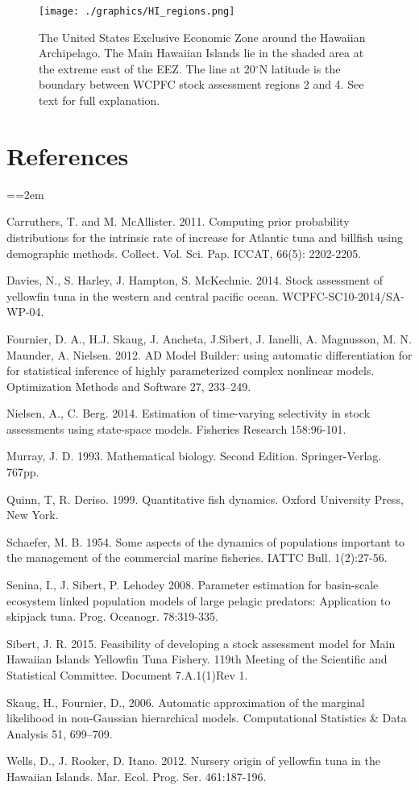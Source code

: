 \documentclass[12pt,letterpaper]{article}
\newcommand\doublespacing{\baselineskip=1.6\normalbaselineskip}
\renewcommand\deg[1]{$^\circ$#1}
\begin{document}
\begin{figure}
\begin{center}
\texttt{[image: ./graphics/HI\_regions.png]}
\caption{\label{fig:mhimap}
The United States Exclusive Economic Zone around the Hawaiian
Archipelago. The Main Hawaiian Islands lie in the shaded area at the
extreme east of the EEZ. The line at 20\deg{N} latitude is the
boundary between WCPFC stock assessment regions 2 and 4. See text for
full explanation.
}
\end{center}
\end{figure}

\section*{References}
{\parindent=0cm \small
\everypar={\hangindent=2em }\par
Carruthers, T. and M. McAllister. 2011.
Computing prior probability distributions for the
intrinsic rate of increase for Atlantic tuna and
billfish using demographic methods.
Collect. Vol. Sci. Pap. ICCAT, 66(5): 2202-2205.

Davies, N., S. Harley, J. Hampton, S. McKechnie. 2014. Stock
assessment of yellowfin tuna in the western and central pacific ocean.
WCPFC-SC10-2014/SA-WP-04.

Fournier, D. A., H.J. Skaug, J. Ancheta, J.Sibert, J. Ianelli, 
A. Magnusson, M. N. Maunder, A. Nielsen. 2012. AD Model Builder:
using automatic differentiation for for statistical inference of highly
parameterized complex nonlinear models. Optimization Methods and
Software 27, 233–249.

Nielsen, A., C. Berg. 2014. Estimation of time-varying selectivity
in stock assessments using state-space models. Fisheries Research
158:96-101.

Murray, J. D. 1993. Mathematical biology. Second Edition.
Springer-Verlag. 767pp.

Quinn, T, R. Deriso. 1999. Quantitative fish dynamics. Oxford
University Press, New York.

Schaefer, M. B. 1954. Some aspects of the dynamics of populations
important to the management of the commercial marine fisheries. IATTC
Bull. 1(2):27-56.

Senina, I., J. Sibert, P. Lehodey  2008. Parameter estimation for
basin-scale ecosystem linked population models of large pelagic
predators: Application to skipjack tuna.  Prog. Oceanogr. 78:319-335.

Sibert, J. R. 2015. Feasibility of developing a stock assessment
model for Main Hawaiian Islands Yellowfin Tuna Fishery.
119th Meeting of the Scientific and Statistical Committee.
Document 7.A.1(1)Rev 1.

Skaug, H., Fournier, D., 2006. Automatic approximation of the marginal
likelihood in non-Gaussian hierarchical models. Computational
Statistics \& Data Analysis 51, 699–709.

Wells, D., J. Rooker, D. Itano. 2012.  Nursery origin of yellowfin
tuna in the Hawaiian Islands. Mar. Ecol. Prog. Ser. 461:187-196. 
\par}


 
\end{document}

